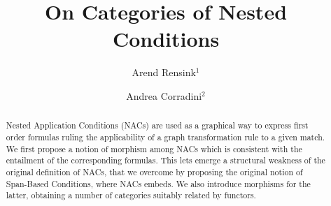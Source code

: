 \title{On Categories of Nested Conditions}

\author{Arend Rensink$^1$ \and Andrea Corradini$^2$}

\maketitle

\begin{abstract}
Nested Application Conditions (NACs) are used as a graphical way to express first order formulas ruling the applicability of a graph transformation rule to a given match. We first propose a notion of morphism among NACs which is consistent with the entailment of the corresponding formulas. This lets emerge
a structural weakness of the original definition of NACs, that we overcome by proposing the original notion of Span-Based Conditions, where NACs embeds. We also introduce morphisms for the latter, obtaining a number of categories suitably related by functors.
\end{abstract}
